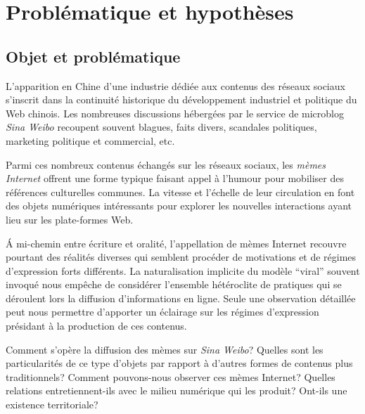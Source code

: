 \chapter*{Problématique et hypothèses}




\section*{Objet et problématique} 

L'apparition en Chine d'une industrie dédiée aux contenus des réseaux sociaux s'inscrit dans la continuité historique du développement industriel et politique du Web chinois. Les nombreuses discussions hébergées par le service de microblog \textit{Sina Weibo} recoupent souvent blagues, faits divers, scandales politiques, marketing politique et commercial, etc.

Parmi ces nombreux contenus échangés sur les réseaux sociaux, les \textit{mèmes Internet} offrent une forme typique faisant appel à l'humour pour mobiliser des références culturelles communes. La vitesse et l'échelle de leur circulation en font des objets numériques intéressants pour explorer les nouvelles interactions ayant lieu sur les plate-formes Web. 

\'A mi-chemin entre écriture et oralité, l’appellation de mèmes Internet recouvre pourtant des réalités diverses qui semblent procéder de motivations et de régimes d'expression forts différents. La naturalisation implicite du modèle ``viral'' souvent invoqué nous empêche de considérer l'ensemble hétéroclite de pratiques qui se déroulent lors la diffusion d'informations en ligne. Seule une observation détaillée peut nous permettre d'apporter un éclairage sur les régimes d'expression présidant à la production de ces contenus.

Comment s'opère la diffusion des mèmes sur \textit{Sina Weibo}? Quelles sont les particularités de ce type d'objets par rapport à d'autres formes de contenus plus traditionnels? Comment pouvons-nous observer ces mèmes Internet? Quelles relations entretiennent-ils avec le milieu numérique qui les produit? Ont-ils une existence territoriale?

